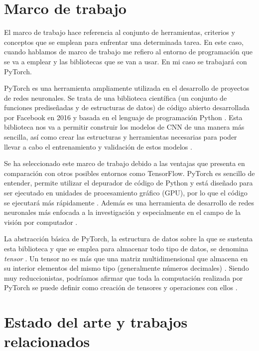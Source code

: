 \section{Marco de trabajo}

El marco de trabajo hace referencia al conjunto de herramientas, criterios y conceptos que se emplean para enfrentar una determinada tarea. En este caso, cuando hablamos de marco de trabajo me refiero al entorno de programación que se va a emplear y las bibliotecas que se van a usar. En mi caso se trabajará con PyTorch.

PyTorch es una herramienta ampliamente utilizada en el desarrollo de proyectos de redes neuronales. Se trata de una biblioteca científica (un conjunto de funciones prediseñadas y de estructuras de datos) de código abierto desarrollada por Facebook en 2016 y basada en el lenguaje de programación Python \cite{marco:pytorch_libro}. Esta biblioteca nos va a permitir construir los modelos de CNN de una manera más sencilla, así como crear las estructuras y herramientas necesarias para poder llevar a cabo el entrenamiento y validación de estos modelos \cite{marco:pytorch}.

Se ha seleccionado este marco de trabajo debido a las ventajas que presenta en comparación con otros posibles entornos como TensorFlow. PyTorch es sencillo de entender, permite utilizar el depurador de código de Python y está diseñado para ser ejecutado en unidades de procesamiento gráfico (GPU), por lo que el código se ejecutará más rápidamente \cite{marco:pytorch_libro}. Además es una herramienta de desarrollo de redes neuronales más enfocada a la investigación y especialmente en el campo de la visión por computador \cite{marco:pytorch}.

La abstracción básica de PyTorch, la estructura de datos sobre la que se sustenta esta biblioteca y que se emplea para almacenar todo tipo de datos, se denomina \textit{tensor} \cite{marco:pytorch_libro}. Un tensor no es más que una matriz multidimensional que almacena en su interior elementos del mismo tipo (generalmente números decimales) \cite{marco:pytorch_web}. Siendo muy reduccionistas, podríamos afirmar que toda la computación realizada por PyTorch se puede definir como creación de tensores y operaciones con ellos \cite{marco:pytorch_libro}.

\section{Estado del arte y trabajos relacionados}

